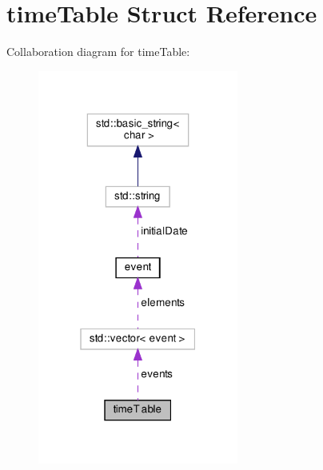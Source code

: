 \hypertarget{structtimeTable}{}\section{time\+Table Struct Reference}
\label{structtimeTable}


Collaboration diagram for time\+Table\+:
\nopagebreak
\begin{figure}[H]
\begin{center}
\leavevmode
\includegraphics[width=187pt]{structtimeTable__coll__graph}
\end{center}
\end{figure}
